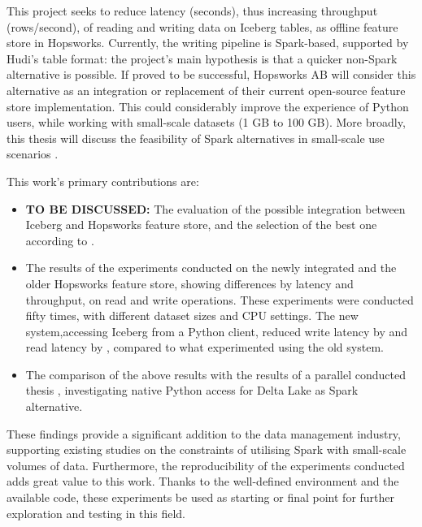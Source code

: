 This project seeks to reduce latency (seconds), thus increasing throughput (rows/second), of reading and writing data on Iceberg tables, as offline feature store in Hopsworks. Currently, the writing pipeline is Spark-based, supported by Hudi's table format: the project's main hypothesis is that a quicker non-Spark alternative is possible. If proved to be successful, Hopsworks AB will consider this alternative as an integration or replacement of their current open-source feature store implementation. This could considerably improve the experience of Python users, while working with small-scale datasets (1 GB to 100 GB). More broadly, this thesis will discuss the feasibility of Spark alternatives in small-scale use scenarios \cite{manfrediReducingReadWrite2024}.


This work's primary contributions are:
\begin{itemize}
    \item \textbf{TO BE DISCUSSED:} The evaluation of the possible integration between Iceberg and Hopsworks feature store, and the selection of the best one according to . 
    \item The results of the experiments conducted on the newly integrated and the older Hopsworks feature store, showing differences by latency and throughput, on read and write operations. These experiments were conducted fifty times, with different dataset sizes and \gls{CPU} settings. The new system,accessing Iceberg from a Python client, reduced write latency by  and read latency by , compared to what experimented using the old system.
    \item The comparison of the above results with the results of a parallel conducted thesis \cite{manfrediReducingReadWrite2024}, investigating native Python access for Delta Lake as Spark alternative.
\end{itemize}

These findings provide a significant addition to the data management industry, supporting existing studies on the constraints of utilising Spark with small-scale volumes of data. Furthermore, the reproducibility of the experiments conducted adds great value to this work. Thanks to the well-defined environment and the available code, these experiments be used as starting or final point for further exploration and testing in this field.